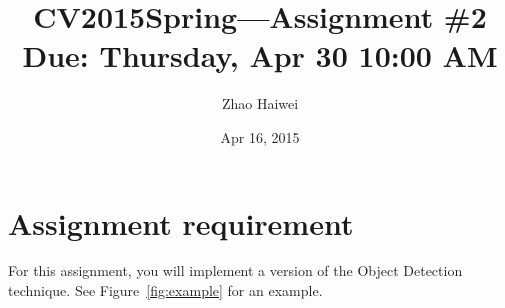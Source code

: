 \documentclass[12pt]{article}
\begin{document}
\title{\vspace{-2em}CV2015Spring---Assignment \#\textbf{2}\\
\normalsize{Due: Thursday, Apr 30 10:00 AM}}
\author{Zhao Haiwei}
\date{\vspace{-0.7em}Apr 16, 2015\vspace{-0.7em}}
\maketitle\thispagestyle{fancy}
\maketitle


\section{Assignment requirement}

For this assignment, you will implement a version of the Object Detection technique. See Figure~\ref{fig:example} for an example.
\end{document}
